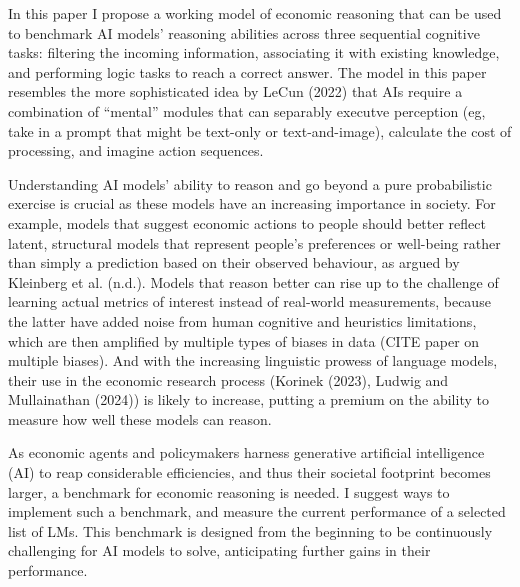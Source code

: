 \documentclass[
]{article}
\begin{document}
In this paper I propose a working model of economic reasoning that can
be used to benchmark AI models' reasoning abilities across three
sequential cognitive tasks: filtering the incoming information,
associating it with existing knowledge, and performing logic tasks to
reach a correct answer. The model in this paper resembles the more
sophisticated idea by LeCun (2022) that AIs require a combination of
``mental'' modules that can separably executve perception (eg, take in a
prompt that might be text-only or text-and-image), calculate the cost of
processing, and imagine action sequences.

Understanding AI models' ability to reason and go beyond a pure
probabilistic exercise is crucial as these models have an increasing
importance in society. For example, models that suggest economic actions
to people should better reflect latent, structural models that represent
people's preferences or well-being rather than simply a prediction based
on their observed behaviour, as argued by Kleinberg et al. (n.d.).
Models that reason better can rise up to the challenge of learning
actual metrics of interest instead of real-world measurements, because
the latter have added noise from human cognitive and heuristics
limitations, which are then amplified by multiple types of biases in
data (CITE paper on multiple biases). And with the increasing linguistic
prowess of language models, their use in the economic research process
(Korinek (2023), Ludwig and Mullainathan (2024)) is likely to increase,
putting a premium on the ability to measure how well these models can
reason.

As economic agents and policymakers harness generative artificial
intelligence (AI) to reap considerable efficiencies, and thus their
societal footprint becomes larger, a benchmark for economic reasoning is
needed. I suggest ways to implement such a benchmark, and measure the
current performance of a selected list of LMs. This benchmark is
designed from the beginning to be continuously challenging for AI models
to solve, anticipating further gains in their performance.
\end{document}
